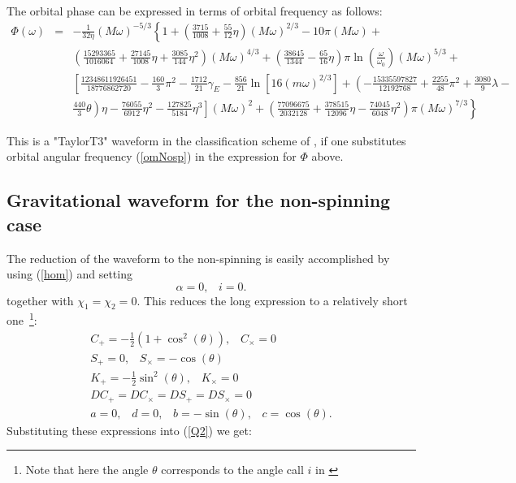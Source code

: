 \documentclass[11pt]{report}
\def\be{\begin{equation}}
\def\ee{\end{equation}}
\def\bea{\begin{eqnarray}}
\def\ena{\end{eqnarray}}
\begin{document}
The orbital phase can be expressed in terms of orbital frequency as follows:
\bea
\Phi(\omega)  &=& -\frac1{32\eta}(M\omega)^{-5/3}\left\{ 1 + \left( \frac{3715}{1008} + \frac{55}{12}\eta\right)
(M\omega)^{2/3} - 10\pi(M\omega) + \right. \nonumber \\
& & \left. \left( \frac{15293365}{1016064} + \frac{27145}{1008}\eta + \frac{3085}{144}\eta^2\right)
(M\omega)^{4/3} + \left( \frac{38645}{1344} - \frac{65}{16}\eta \right)\pi\ln\left( \frac{\omega}{\omega_0}\right) (M\omega)^{5/3}+ \right. \nonumber \\
& &  \left. \left[ \frac{12348611926451}{18776862720} -\frac{160}{3}\pi^2 - \frac{1712}{21}\gamma_E
- \frac{856}{21}\ln\left[ 16(m\omega)^{2/3}\right] + \left( -\frac{15335597827}{12192768} +
\frac{2255}{48}\pi^2 + \frac{3080}{9}\lambda - \right.\right.\right. \nonumber \\
& & \left.\left.\left.  \frac{440}{3}\theta\right)\eta - \frac{76055}{6912}\eta^2 - 
\frac{127825}{5184}\eta^3\right](M\omega)^{2} + \left( \frac{77096675}{2032128} + 
\frac{378515}{12096}\eta - \frac{74045}{6048}\eta^2\right)\pi(M\omega)^{7/3} 
\right\}
\ena

This is a "TaylorT3" waveform in the classification scheme of \cite{DIS}, if one substitutes orbital angular frequency (\ref{omNosp}) in the 
expression for $\Phi$ above.

\subsection{Gravitational waveform for the non-spinning case}

The reduction of the waveform to the non-spinning  is easily accomplished by using (\ref{hom})
and setting 
\be
\alpha =0,\;\;\; i = 0.
\ee
together with $\chi_1=\chi_2=0$.
This reduces the long expression to a relatively short one~\footnote{Note that here the angle $\theta$ corresponds
to the angle call $i$ in \cite{FC}}:
\bea
C_{+} = -\frac1{2}(1+ \cos^2(\theta)), \;\;\; C_{\times} = 0\\
S_{+} = 0,\;\;\; S_{\times} = -\cos(\theta)\\
K_{+} = -\frac1{2}\sin^2(\theta),\;\;\; K_{\times} = 0\\
DC_{+}=DC_{\times}=DS_{+}=DS_{\times} = 0\\
a=0,\;\;\; d=0,\;\;\; b=-\sin(\theta),\;\;\; c=\cos(\theta). 
\ena
Substituting these expressions into (\ref{Q2}) we get:
\end{document}
